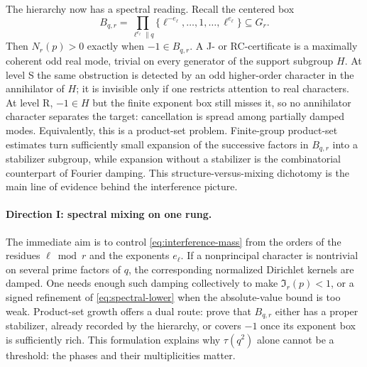 \documentclass[11pt]{article}
\theoremstyle{definition}
\theoremstyle{remark}
\begin{document}
The hierarchy now has a spectral reading. Recall the centered box
\[
 B_{q,r}=\prod_{\ell^{e_\ell}\parallel q}
 \{\ell^{-e_\ell},\ldots,1,\ldots,\ell^{e_\ell}\}\subseteq G_r .
\]
Then $N_r(p)>0$ exactly when $-1\in B_{q,r}$. A J- or RC-certificate is a maximally
coherent odd real mode, trivial on every generator of the support subgroup $H$. At
level S the same obstruction is detected by an odd higher-order character in the
annihilator of $H$; it is invisible only if one restricts attention to real characters.
At level R, $-1\in H$ but the finite exponent box still misses it, so no annihilator
character separates the target: cancellation is spread among partially damped modes.
Equivalently, this is a product-set problem. Finite-group product-set estimates turn
sufficiently small expansion of the successive factors in $B_{q,r}$ into a stabilizer
subgroup, while expansion without a stabilizer is the combinatorial counterpart of
Fourier damping. This structure-versus-mixing dichotomy is the main line of evidence
behind the interference picture.

\paragraph{Direction I: spectral mixing on one rung.}
The immediate aim is to control \eqref{eq:interference-mass} from the orders of the
residues $\ell\bmod r$ and the exponents $e_\ell$. If a nonprincipal character is
nontrivial on several prime factors of $q$, the corresponding normalized Dirichlet
kernels are damped. One needs enough such damping collectively to make
$\mathfrak I_r(p)<1$, or a signed refinement of \eqref{eq:spectral-lower} when the
absolute-value bound is too weak. Product-set growth offers a dual route: prove
that $B_{q,r}$ either has a proper stabilizer, already recorded by the hierarchy, or
covers $-1$ once its exponent box is sufficiently rich. This formulation explains why
$\tau(q^2)$ alone cannot be a threshold: the phases and their multiplicities matter.
\end{document}
